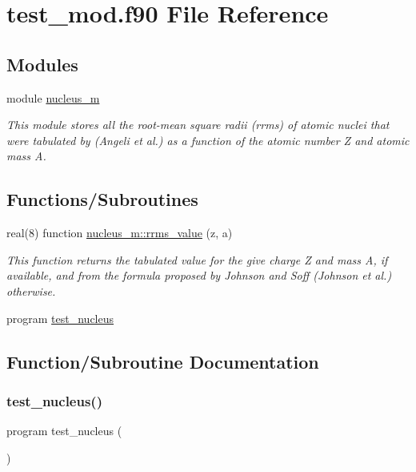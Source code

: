 \hypertarget{test__mod_8f90}{}\section{test\+\_\+mod.\+f90 File Reference}
\label{test__mod_8f90}
\subsection*{Modules}
\begin{DoxyCompactItemize}
\item 
module \mbox{\hyperlink{namespacenucleus__m}{nucleus\+\_\+m}}
\begin{DoxyCompactList}\small\item\em This module stores all the root-\/mean square radii (rrms) of atomic nuclei that were tabulated by (Angeli et al.) as a function of the atomic number Z and atomic mass A. \end{DoxyCompactList}\end{DoxyCompactItemize}
\subsection*{Functions/\+Subroutines}
\begin{DoxyCompactItemize}
\item 
real(8) function \mbox{\hyperlink{namespacenucleus__m_a83e8714be10756711874d134c66bcf73}{nucleus\+\_\+m\+::rrms\+\_\+value}} (z, a)
\begin{DoxyCompactList}\small\item\em This function returns the tabulated value for the give charge Z and mass A, if available, and from the formula proposed by Johnson and Soff (Johnson et al.) otherwise. \end{DoxyCompactList}\item 
program \mbox{\hyperlink{test__mod_8f90_a8ebb53a70bcfe3c94dbfbae3e3f52cba}{test\+\_\+nucleus}}
\end{DoxyCompactItemize}


\subsection{Function/\+Subroutine Documentation}
\mbox{\label{test__mod_8f90_a8ebb53a70bcfe3c94dbfbae3e3f52cba}} 
\subsubsection{\texorpdfstring{test\_nucleus()}{test\_nucleus()}}
{\footnotesize\ttfamily program test\+\_\+nucleus (\begin{DoxyParamCaption}{ }\end{DoxyParamCaption})}

